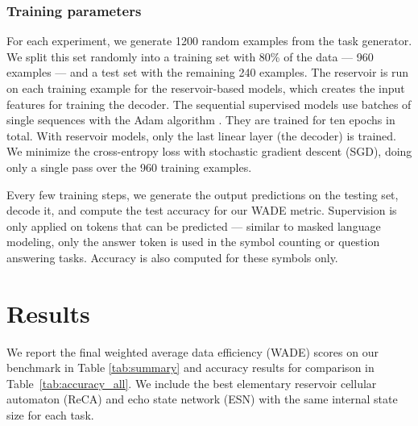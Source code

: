 \subsubsection{Training parameters}
For each experiment, we generate 1200 random examples from the task generator.
We split this set randomly into a training set with 80\% of the data --- 960
examples --- and a test set with the remaining 240 examples. The reservoir is run
on each training example for the reservoir-based models, which creates the
input features for training the decoder. The sequential supervised models use
batches of single sequences with the Adam algorithm
\parencite{kingmaAdamMethodStochastic2015}. They are trained for ten epochs in total. With
reservoir models, only the last linear layer (the decoder) is trained. We minimize the
cross-entropy loss with stochastic gradient descent (SGD), doing only a single
pass over the 960 training examples.

Every few training steps, we generate the output predictions on the testing set,
decode it, and compute the test accuracy for our WADE metric. Supervision is only
applied on tokens that can be predicted --- similar to masked language modeling,
\eg only the answer token is used in the symbol counting or question answering
tasks. Accuracy is also computed for these symbols only.

\section{Results}

We report the final weighted average data efficiency (WADE) scores on our
benchmark in Table \ref{tab:summary} and accuracy results for comparison in Table~\ref{tab:accuracy_all}. We include the best
elementary reservoir cellular automaton (ReCA) and echo
state network (ESN) with the same internal state size for each task.


